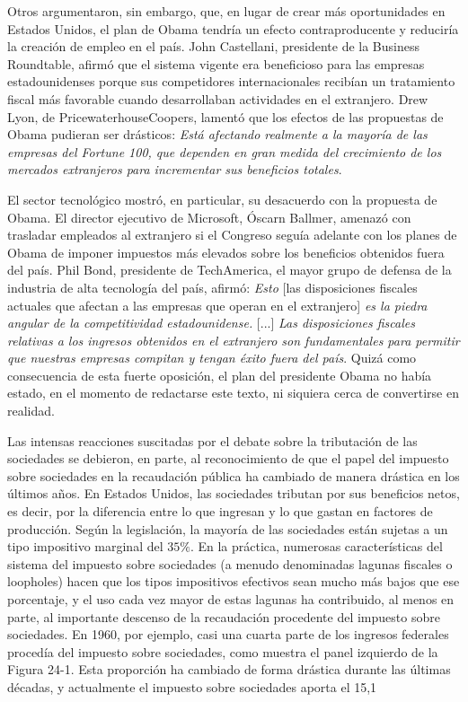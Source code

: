 \documentclass[10pt,a4paper]{article}
\begin{document}
{Otros argumentaron, sin embargo, que, en lugar de crear más oportunidades en Estados Unidos, el plan de Obama tendría un efecto contraproducente y reduciría la creación de empleo en el país. John Castellani, presidente de la Business Roundtable, afirmó que el sistema vigente era beneficioso para las empresas estadounidenses porque sus competidores internacionales recibían un tratamiento fiscal más favorable cuando desarrollaban actividades en el extranjero. Drew Lyon, de PricewaterhouseCoopers, lamentó que los efectos de las propuestas de Obama pudieran ser drásticos: \textit{Está afectando realmente a la mayoría de las empresas del Fortune 100, que dependen en gran medida del crecimiento de los mercados extranjeros para incrementar sus beneficios totales}.

El sector tecnológico mostró, en particular, su desacuerdo con la propuesta de Obama. El director ejecutivo de Microsoft, Óscarn Ballmer, amenazó con trasladar empleados al extranjero si el Congreso seguía adelante con los planes de Obama de imponer impuestos más elevados sobre los beneficios obtenidos fuera del país. Phil Bond, presidente de TechAmerica, el mayor grupo de defensa de la industria de alta tecnología del país, afirmó: \textit{Esto} [las disposiciones fiscales actuales que afectan a las empresas que operan en el extranjero] \textit{es la piedra angular de la competitividad estadounidense.} [...]\textit{ Las disposiciones fiscales relativas a los ingresos obtenidos en el extranjero son fundamentales para permitir que nuestras empresas compitan y tengan éxito fuera del país}. Quizá como consecuencia de esta fuerte oposición, el plan del presidente Obama no había estado, en el momento de redactarse este texto, ni siquiera cerca de convertirse en realidad.

Las intensas reacciones suscitadas por el debate sobre la tributación de las sociedades se debieron, en parte, al reconocimiento de que el papel del impuesto sobre sociedades en la recaudación pública ha cambiado de manera drástica en los últimos años. En Estados Unidos, las sociedades tributan por sus beneficios netos, es decir, por la diferencia entre lo que ingresan y lo que gastan en factores de producción. Según la legislación, la mayoría de las sociedades están sujetas a un tipo impositivo marginal del $35\%$. En la práctica, numerosas características del sistema del impuesto sobre sociedades (a menudo denominadas lagunas fiscales o loopholes) hacen que los tipos impositivos efectivos sean mucho más bajos que ese porcentaje, y el uso cada vez mayor de estas lagunas ha contribuido, al menos en parte, al importante descenso de la recaudación procedente del impuesto sobre sociedades. En 1960, por ejemplo, casi una cuarta parte de los ingresos federales procedía del impuesto sobre sociedades, como muestra el panel izquierdo de la Figura 24-1. Esta proporción ha cambiado de forma drástica durante las últimas décadas, y actualmente el impuesto sobre sociedades aporta el 15,1 %

}
\end{document}
